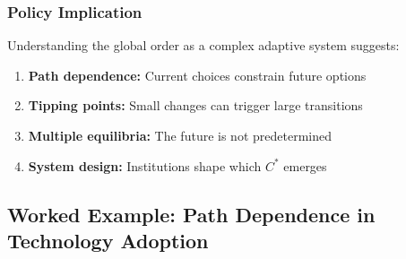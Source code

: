 \subsubsection{Policy Implication}

Understanding the global order as a complex adaptive system suggests:
\begin{enumerate}
    \item \textbf{Path dependence:} Current choices constrain future options
    \item \textbf{Tipping points:} Small changes can trigger large transitions
    \item \textbf{Multiple equilibria:} The future is not predetermined
    \item \textbf{System design:} Institutions shape which $C^*$ emerges
\end{enumerate}

\subsection{Worked Example: Path Dependence in Technology Adoption}
\label{sec:ag-worked-example}


